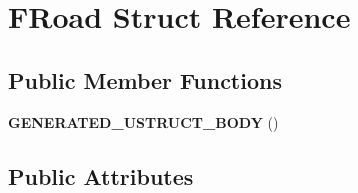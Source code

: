 \hypertarget{struct_f_road}{}\section{F\+Road Struct Reference}
\label{struct_f_road}
\subsection*{Public Member Functions}
\begin{DoxyCompactItemize}
\item 
\mbox{\label{struct_f_road_ad49ebf488225d11d0dde41874670d192}} 
{\bfseries G\+E\+N\+E\+R\+A\+T\+E\+D\+\_\+\+U\+S\+T\+R\+U\+C\+T\+\_\+\+B\+O\+DY} ()
\end{DoxyCompactItemize}
\subsection*{Public Attributes}

